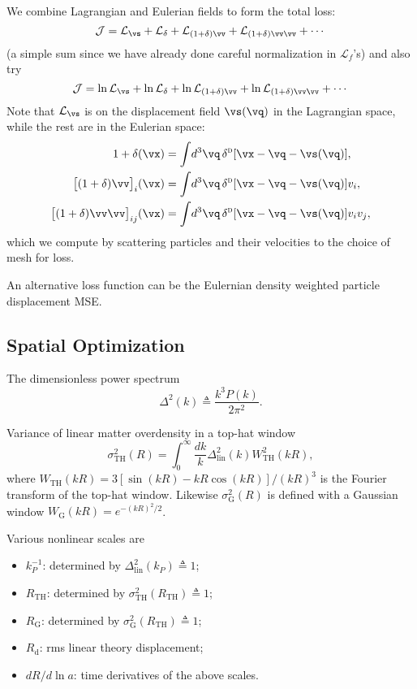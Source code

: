 \documentclass[usenatbib]{mnras}
\newcommand{\deltaD}{\delta^\textsc{d}}
\renewcommand{\d}{d}
\newcommand{\cJ}{\mathcal{J}}
\newcommand{\cL}{\mathcal{L}}
\newcommand{\linear}{\mathrm{lin}}
\newcommand{\tophat}{\mathrm{TH}}
\newcommand{\gauss}{\mathrm{G}}
\newcommand{\YL}[1]{\textcolor{Bittersweet}{#1}}
\begin{document}
We combine Lagrangian and Eulerian fields to form the total loss:
%
\begin{equation}
\cJ = \cL_\vs + \cL_\delta
+ \cL_{(1+\delta)\vv} + \cL_{(1+\delta)\vv\vv}
+ \cdots
\end{equation}
%
\YL{(a simple sum since we have already done careful normalization in
$\cL_f$'s) and also try}
%
\begin{equation}
\cJ = \ln \cL_\vs + \ln \cL_\delta
+ \ln \cL_{(1+\delta)\vv} + \ln \cL_{(1+\delta)\vv\vv}
+ \cdots
\end{equation}
%
Note that $\cL_\vs$ is on the displacement field $\vs(\vq)$ in the
Lagrangian space, while the rest are in the Eulerian space:
%
\begin{align}
1 + \delta(\vx) &= \int\!\d^3\vq\,
\deltaD[ \vx - \vq - \vs(\vq)], \nonumber\\
%
\bigl[(1+\delta)\vv\bigr]_i(\vx) &= \int\!\d^3\vq\,
\deltaD[ \vx - \vq - \vs(\vq)] v_i, \nonumber\\
%
\bigl[(1+\delta)\vv\vv\bigr]_{ij}(\vx) &= \int\!\d^3\vq\,
\deltaD[ \vx - \vq - \vs(\vq)] v_i v_j,
\end{align}
%
which we compute by scattering particles and their velocities to the
\YL{choice of mesh for loss}.

An alternative loss function can be the Eulernian density weighted
particle displacement MSE.



\subsection{Spatial Optimization}
\label{sec:so}

The dimensionless power spectrum
%
\begin{equation}
\Delta^2(k) \triangleq \frac{k^3 P(k)}{2 \pi^2}.
\end{equation}

Variance of linear matter overdensity in a top-hat window
%
\begin{equation}
\sigma_\tophat^2(R) = \int_0^\infty \frac{\d k}k
  \Delta_\linear^2(k) W_\tophat^2(kR),
\end{equation}
where $W_\tophat(kR) = 3[\sin(kR) - kR\cos(kR)] / (kR)^3$ is the
Fourier transform of the top-hat window.
Likewise $\sigma_\gauss^2(R)$ is defined with a Gaussian window
$W_\gauss(kR) = e^{-(kR)^2/2}$.


Various nonlinear scales are
\begin{itemize}
\item $k_P^{-1}$: determined by $\Delta_\linear^2(k_P) \triangleq 1$;
\item $R_\tophat$: determined by $\sigma_\tophat^2(R_\tophat) \triangleq
  1$;
\item $R_\gauss$: determined by $\sigma_\gauss^2(R_\tophat) \triangleq
  1$;
\item $R_\mathrm{d}$: rms linear theory displacement;
\item $\d R / \d\ln a$: time derivatives of the above scales.
\end{itemize}
\end{document}
